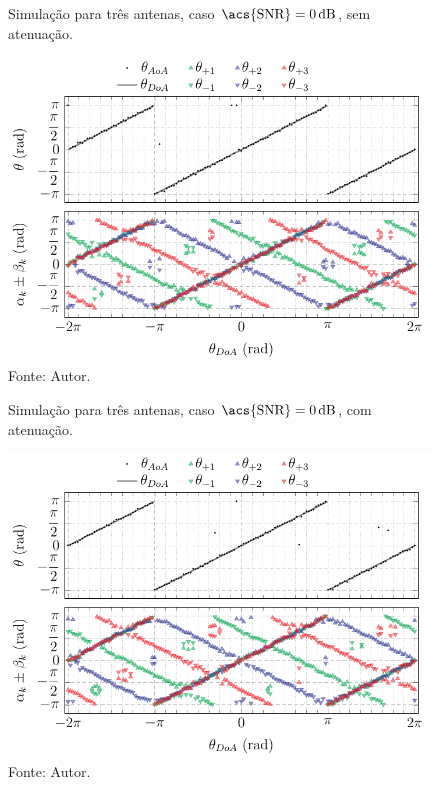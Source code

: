 \begin{figure}[H]
    \centering
    \caption{Simulação para três antenas, caso $\text{\acs{SNR}} = \SI{0}{\deci\bel}$, sem atenuação.}
    \label{fig:simul_POLY_3_R_50_SNR_1}
    \includegraphics{../pictures/simul_POLY_3_R_50_SNR_1.pdf}
    \caption*{Fonte: Autor.}
\end{figure}

\begin{figure}[H]
    \centering
    \caption{Simulação para três antenas, caso $\text{\acs{SNR}} = \SI{0}{\deci\bel}$, com atenuação.}
    \label{fig:simul_POLY_3_R_50_SNR_1_ATT}
    \includegraphics{../pictures/simul_POLY_3_R_50_SNR_1_ATT.pdf}
    \caption*{Fonte: Autor.}
\end{figure}

